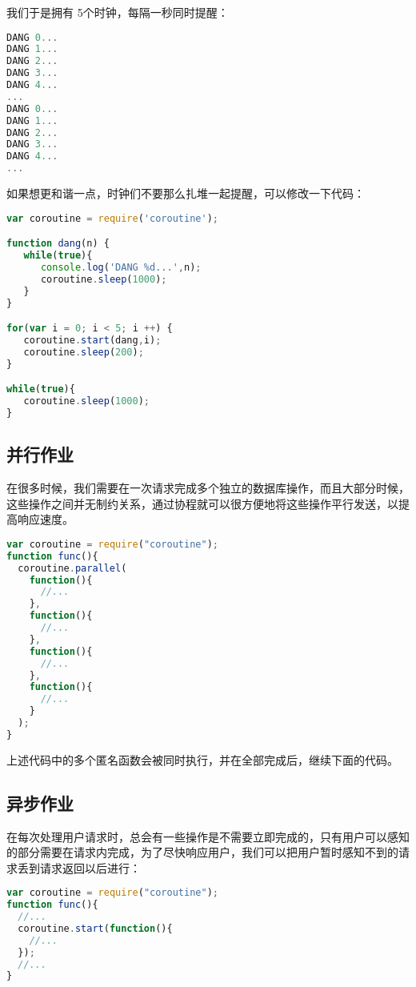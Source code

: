 我们于是拥有 5个时钟，每隔一秒同时提醒：


\begin{lstlisting}[language=JavaScript]
DANG 0...
DANG 1...
DANG 2...
DANG 3...
DANG 4...
...
DANG 0...
DANG 1...
DANG 2...
DANG 3...
DANG 4...
...
\end{lstlisting}



如果想更和谐一点，时钟们不要那么扎堆一起提醒，可以修改一下代码：


\begin{lstlisting}[language=JavaScript]
var coroutine = require('coroutine');

function dang(n) {
   while(true){
      console.log('DANG %d...',n);
      coroutine.sleep(1000);
   }
}

for(var i = 0; i < 5; i ++) {
   coroutine.start(dang,i);
   coroutine.sleep(200);
}

while(true){
   coroutine.sleep(1000);
}
\end{lstlisting}


\subsection{并行作业}


在很多时候，我们需要在一次请求完成多个独立的数据库操作，而且大部分时候，这些操作之间并无制约关系，通过协程就可以很方便地将这些操作平行发送，以提高响应速度。



\begin{lstlisting}[language=JavaScript]
var coroutine = require("coroutine");
function func(){
  coroutine.parallel(
    function(){
      //...
    }, 
    function(){
      //...
    }, 
    function(){
      //...
    }, 
    function(){
      //...
    }
  );
}
\end{lstlisting}

上述代码中的多个匿名函数会被同时执行，并在全部完成后，继续下面的代码。


\subsection{异步作业}


在每次处理用户请求时，总会有一些操作是不需要立即完成的，只有用户可以感知的部分需要在请求内完成，为了尽快响应用户，我们可以把用户暂时感知不到的请求丢到请求返回以后进行：

\begin{lstlisting}[language=JavaScript]
var coroutine = require("coroutine");
function func(){
  //...
  coroutine.start(function(){
    //...
  });
  //...
}
\end{lstlisting}

